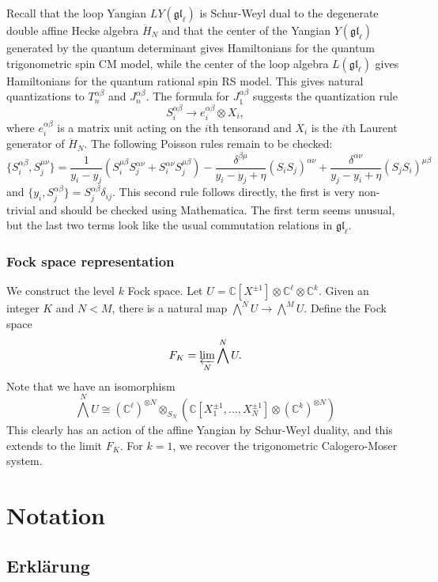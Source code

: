 \documentclass[11pt]{report}
\theoremstyle{definition}
\theoremstyle{remark}
\theoremstyle{remark}
\newcommand{\C}{\mathbb{C}}
\begin{document}
Recall that the loop Yangian $LY(\mathfrak{gl}_\ell)$ is Schur-Weyl dual to the degenerate double affine Hecke algebra $\ddot H_N$ and that the center of the Yangian $Y(\mathfrak{gl}_\ell)$ generated by the quantum determinant gives Hamiltonians for the quantum trigonometric spin CM model, while the center of the loop algebra $L(\mathfrak{gl}_\ell)$ gives Hamiltonians for the quantum rational spin RS model. This gives natural quantizations to $T_n^{\alpha\beta}$ and $J_n^{\alpha\beta}$. The formula for $J_1^{\alpha\beta}$ suggests the quantization rule
\begin{equation*}
S_i^{\alpha\beta} \to e_i^{\alpha\beta} \otimes X_i,
\end{equation*}
where $e_i^{\alpha\beta}$ is a matrix unit acting on the $i$th tensorand and $X_i$ is the $i$th Laurent generator of $\ddot H_N$. The following Poisson rules remain to be checked:
\begin{equation*}
\{ S_i^{\alpha\beta},S_j^{\mu\nu} \} = \frac{1}{y_i-y_j} (S_i^{\mu\beta} S_j^{\alpha\nu} + S_i^{\alpha\nu} S_j^{\mu\beta}) - \frac{\delta^{\beta\mu}}{y_i-y_j+\eta} (S_iS_j)^{\alpha\nu} + \frac{\delta^{\alpha\nu}}{y_j-y_i+\eta} (S_jS_i)^{\mu\beta} 
\end{equation*}
and $\{ y_i, S_j^{\alpha\beta} \} = S_j^{\alpha\beta} \delta_{ij}$. This second rule follows directly, the first is very non-trivial and should be checked using Mathematica. The first term seems unusual, but the last two terms look like the usual commutation relations in $\mathfrak{gl}_\ell$.

\subsection{Fock space representation}

\cite{article:kodera:2016}

We construct the level $k$ Fock space. Let $U = \C[X^{\pm 1}] \otimes \C^\ell \otimes \C^k$. Given an integer $K$ and $N<M$, there is a natural map $\bigwedge^N U \to \bigwedge^M U$. Define the Fock space
\begin{equation*}
F_K = \varprojlim_N \bigwedge^N U.
\end{equation*}
Note that we have an isomorphism
\begin{equation*}
\bigwedge^N U \cong (\C^\ell)^{\otimes N} \otimes_{S_N} (\C[X_1^{\pm 1},...,X_N^{\pm 1}] \otimes (\C^k)^{\otimes N})
\end{equation*}
This clearly has an action of the affine Yangian by Schur-Weyl duality, and this extends to the limit $F_K$. For $k=1$, we recover the trigonometric Calogero-Moser system.

\pagebreak

\chapter*{Notation}\label{chapter:notation}

\pagebreak

\printindex




\pagebreak

\section*{Erklärung}
\end{document}
